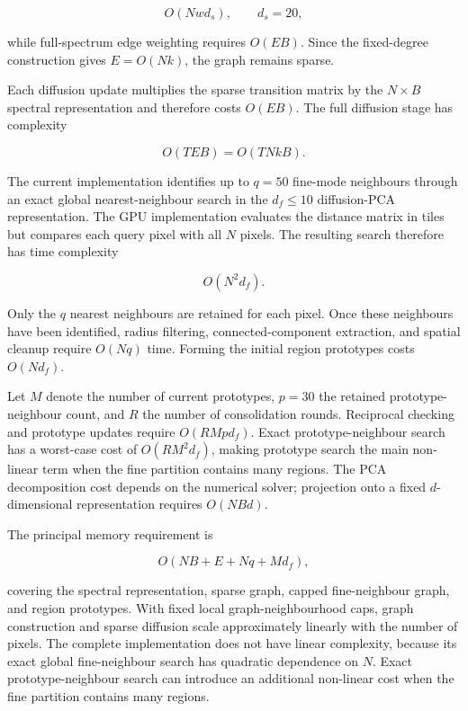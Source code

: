\documentclass[10pt,a4paper,fleqn]{article}
\begin{document}
\begin{equation}
O\!\left(Nwd_s\right),
\qquad d_s=20,
\end{equation}

while full-spectrum edge weighting requires \(O(EB)\). Since the fixed-degree
construction gives \(E=O(Nk)\), the graph remains sparse.

Each diffusion update multiplies the sparse transition matrix by the
\(N\times B\) spectral representation and therefore costs \(O(EB)\). The full
diffusion stage has complexity

\begin{equation}
O\!\left(TEB\right)
=
O\!\left(TNkB\right).
\label{eq:diffusion_complexity}
\end{equation}

The current implementation identifies up to \(q=50\) fine-mode neighbours
through an exact global nearest-neighbour search in the
\(d_f\leq10\) diffusion-PCA representation. The GPU implementation evaluates
the distance matrix in tiles but compares each query pixel with all \(N\)
pixels. The resulting search therefore has time complexity

\begin{equation}
O\!\left(N^{2}d_f\right).
\label{eq:fine_knn_complexity}
\end{equation}

Only the \(q\) nearest neighbours are retained for each pixel. Once these
neighbours have been identified, radius filtering, connected-component
extraction, and spatial cleanup require \(O(Nq)\) time. Forming the initial
region prototypes costs \(O(Nd_f)\).

Let \(M\) denote the number of current prototypes, \(p=30\) the retained
prototype-neighbour count, and \(R\) the number of consolidation rounds.
Reciprocal checking and prototype updates require
\(O(RMpd_f)\). Exact prototype-neighbour search has a worst-case cost of
\(O(RM^{2}d_f)\), making prototype search the main non-linear term when the
fine partition contains many regions. The PCA decomposition cost depends on
the numerical solver; projection onto a fixed \(d\)-dimensional representation
requires \(O(NBd)\).

The principal memory requirement is

\begin{equation}
O\!\left(NB+E+Nq+Md_f\right),
\label{eq:memory_complexity}
\end{equation}

covering the spectral representation, sparse graph, capped fine-neighbour
graph, and region prototypes. With fixed local graph-neighbourhood caps, graph
construction and sparse diffusion scale approximately linearly with the number
of pixels. The complete implementation does not have linear complexity,
because its exact global fine-neighbour search has quadratic dependence on
\(N\). Exact prototype-neighbour search can introduce an additional non-linear
cost when the fine partition contains many regions.
\end{document}
